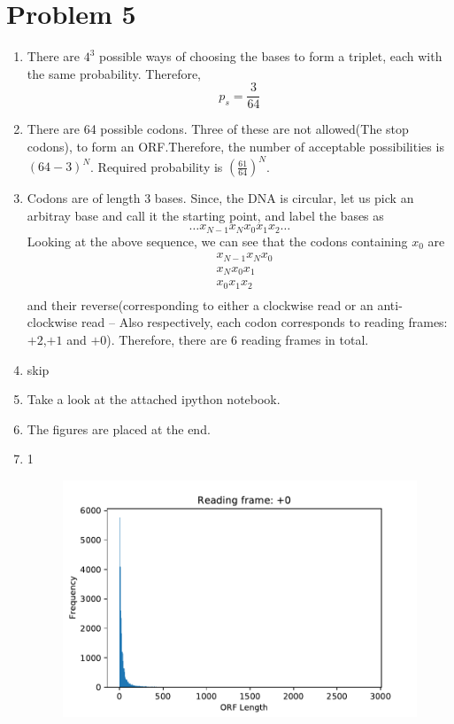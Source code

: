 \documentclass[a4paper]{article}
\begin{document}
\section{Problem 5}
\begin{enumerate}[label=(\alph*)]
    \item There are $4^3$ possible ways of choosing the bases to form a triplet, each with the same probability. Therefore, $$p_{s}=\frac{3}{64}$$
	\item There are 64 possible codons. Three of these are not allowed(The stop codons), to form an ORF.Therefore, the number of acceptable possibilities is $(64-3)^{N}$.\newline
	Required probability is $\left(\frac{61}{64}\right)^{N}$.
	\item Codons are of length $3$ bases. Since, the DNA is circular, let us pick an arbitray base and call it the starting point, and label the bases as $$\dots x_{N-1}x_{N}x_{0}x_{1}x_{2}\dots$$
    Looking at the above sequence, we can see that the codons containing $x_{0}$ are
    \begin{align*}
        & x_{N-1}x_{N}x_{0} \\
        & x_{N}x_{0}x_{1} \\
        & x_{0}x_{1}x_{2} \\
    \end{align*} and their reverse(corresponding to either a clockwise read or an anti-clockwise read -- Also respectively, each codon corresponds to reading frames: $+2$,$+1$ and $+0$). Therefore, there are $6$ reading frames in total. 
    \item skip
    \item Take a look at the attached ipython notebook.
    \item The figures are placed at the end. 
    \item 1
    \begin{figure}
        \includegraphics{q5f0.pdf}

\end{figure}
\end{enumerate}
\end{document}

